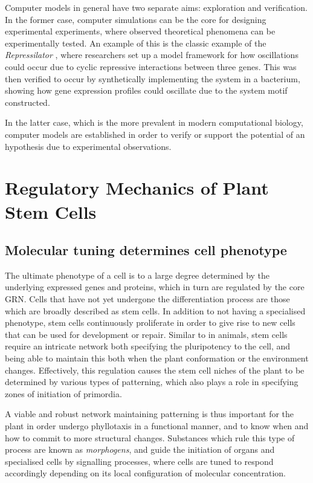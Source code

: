 Computer models in general have two separate aims: exploration and verification.
In the former case, computer simulations can be the core for designing
experimental experiments, where observed theoretical phenomena can be
experimentally tested. An example of this is the classic example of the
\textit{Repressilator} \CITE, where researchers set up a model framework for how
oscillations could occur due to cyclic repressive interactions between three
genes. This was then verified to occur by synthetically implementing the system
in a bacterium, showing how gene expression profiles could oscillate due to the
system motif constructed. 

In the latter case, which is the more prevalent in modern computational biology,
computer models are established in order to verify or support the potential of
an hypothesis due to experimental observations. \CITE 
\REWRITE

\section{Regulatory Mechanics of Plant Stem Cells} %
\subsection{Molecular tuning determines cell phenotype} %
The ultimate phenotype of a cell is to a large degree determined by the underlying
expressed genes and proteins, which in turn are regulated by the core GRN. Cells
that have not yet undergone the differentiation process are those which are
broadly described as stem cells. In addition to not having a specialised phenotype,
stem cells continuously proliferate in order to give rise to new cells that can
be used for development or repair. \CITE
Similar to in animals, stem cells require an intricate network both specifying
the pluripotency to the cell, and being able to maintain this both when the plant
conformation or the environment changes. Effectively, this regulation causes the
stem cell niches of the plant to be determined by various types of patterning,
which also plays a role in specifying zones of initiation of primordia.

A viable and robust network maintaining patterning is thus important for 
the plant in order undergo phyllotaxis in a functional manner, and to know when
and how to commit to more structural changes. Substances which rule this type of
process are known as \textit{morphogens}, and guide the initiation of organs and
specialised cells by signalling processes, where cells are tuned to respond
accordingly depending on its local configuration of molecular concentration.


